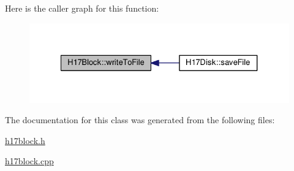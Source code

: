 Here is the caller graph for this function\+:
\nopagebreak
\begin{figure}[H]
\begin{center}
\leavevmode
\includegraphics[width=327pt]{classH17Block_a59901675cd140c907fb6de4c8e0452d5_icgraph}
\end{center}
\end{figure}




The documentation for this class was generated from the following files\+:\begin{DoxyCompactItemize}
\item 
\hyperlink{h17block_8h}{h17block.\+h}\item 
\hyperlink{h17block_8cpp}{h17block.\+cpp}\end{DoxyCompactItemize}

